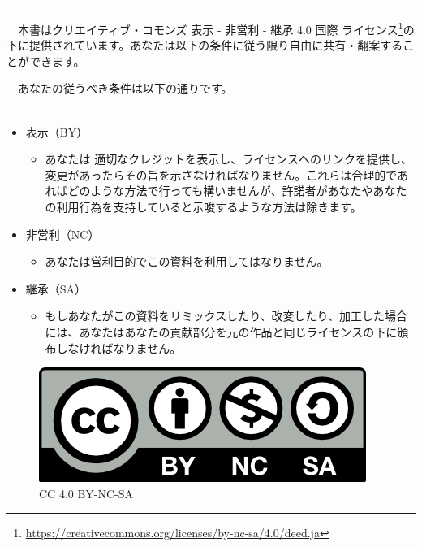 \documentclass[
  12pt,
]{book}
\DeclareRobustCommand{\href}[2]{#2\footnote{\url{#1}}}
\providecommand{\tightlist}{%
  \setlength{\itemsep}{0pt}\setlength{\parskip}{0pt}}
\begin{document}
\begin{center}\rule{0.5\linewidth}{0.5pt}\end{center}

　本書は\href{https://creativecommons.org/licenses/by-nc-sa/4.0/deed.ja}{クリエイティブ・コモンズ 表示 - 非営利 - 継承 4.0 国際 ライセンス}の下に提供されています。あなたは以下の条件に従う限り自由に共有・翻案することができます。

　あなたの従うべき条件は以下の通りです。\\
　

\begin{warning-box}

\begin{itemize}
\item
  表示（BY）

  \begin{itemize}
  \tightlist
  \item
    あなたは 適切なクレジットを表示し、ライセンスへのリンクを提供し、変更があったらその旨を示さなければなりません。これらは合理的であればどのような方法で行っても構いませんが、許諾者があなたやあなたの利用行為を支持していると示唆するような方法は除きます。
  \end{itemize}
\item
  非営利（NC）

  \begin{itemize}
  \tightlist
  \item
    あなたは営利目的でこの資料を利用してはなりません。
  \end{itemize}
\item
  継承（SA）

  \begin{itemize}
  \tightlist
  \item
    もしあなたがこの資料をリミックスしたり、改変したり、加工した場合には、あなたはあなたの貢献部分を元の作品と同じライセンスの下に頒布しなければなりません。
  \end{itemize}
\end{itemize}

\end{warning-box}

\begin{figure}
\centering
\includegraphics{"./fig/by-nc-sa.png"}
\caption{CC 4.0 BY-NC-SA}
\end{figure}
\end{document}
